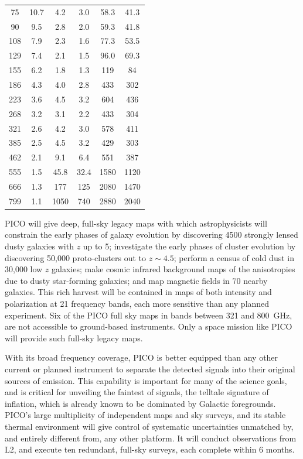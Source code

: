 \documentclass[PICOAPC.tex]{subfiles}
\begin{document}
\begin{table}
\begin{minipage}[t]{0.6\textwidth}
\begin{tabular}{|c|c|c|c|c|c|}
75& 10.7 & 4.2 & 3.0 & 58.3 & 41.3\\ 
90 & 9.5 & 2.8 & 2.0 & 59.3 & 41.8\\ 
108 & 7.9 & 2.3 & 1.6 & 77.3 & 53.5\\ 
129 & 7.4 & 2.1 & 1.5 & 96.0 & 69.3\\ 
155 & 6.2 & 1.8 & 1.3 & 119 & 84\\ 
186 & 4.3 & 4.0 & 2.8 & 433 & 302\\ 
223 & 3.6 & 4.5 & 3.2 & 604 & 436\\ 
268 & 3.2 & 3.1 & 2.2 & 433 & 304\\ 
321 & 2.6 & 4.2 & 3.0 & 578 & 411\\ 
385 & 2.5 & 4.5 & 3.2 & 429 & 303\\ 
462 & 2.1 & 9.1 & 6.4 & 551 & 387\\ 
555 & 1.5 & 45.8 & 32.4 & 1580 & 1120\\ 
666 & 1.3 & 177 & 125 & 2080 & 1470\\ 
799 & 1.1 & 1050 & 740 & 2880 & 2040\\ 
\hline
\end{tabular}

\end{minipage}
\end{table}




PICO will give deep, full-sky legacy maps with which astrophysicists will constrain the early phases of galaxy evolution by discovering 4500 strongly lensed dusty galaxies with $z$ up to 5; investigate the early phases of cluster evolution by discovering 50,000 proto-clusters out to $z\sim4.5$; perform a census of cold dust in 30,000 low $z$ galaxies; make cosmic infrared background maps of the anisotropies due to dusty star-forming galaxies; and map magnetic fields in 70 nearby galaxies. This rich harvest will be contained in maps of both intensity and polarization at 21 frequency bands, each more sensitive than any planned experiment. Six of the PICO full sky maps in bands between 321 and 800~GHz, are not accessible to ground-based instruments. Only a space mission like PICO will provide such full-sky legacy maps. 



With its broad frequency coverage, PICO is better equipped than any other current or planned instrument to separate the detected signals into their original sources of emission.  This capability is important for many of the science goals, and is critical for unveiling the faintest of signals, the telltale signature of inflation, which is already known to be dominated by Galactic foregrounds. 
PICO's large multiplicity of independent maps and sky surveys, and its stable thermal environment will give control of systematic uncertainties unmatched by, and entirely different from, any other platform. It will conduct observations from L2, and execute ten redundant,  full-sky surveys, each complete within 6 months. 
\end{document}
